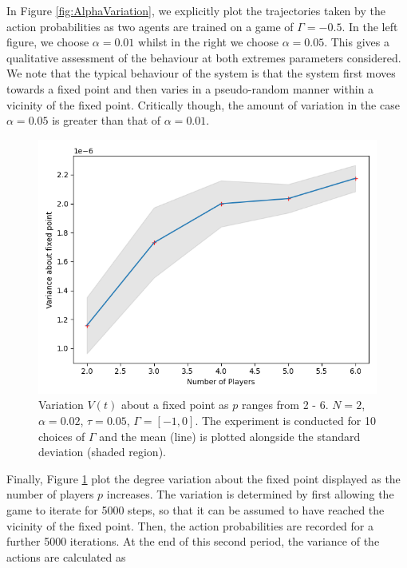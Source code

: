 \documentclass[sigconf,anonymous]{aamas}
\begin{document}
In Figure \ref{fig:AlphaVariation}, we explicitly plot the trajectories taken by the action probabilities as two agents are trained on a game of $\Gamma = -0.5$. In the left figure, we choose $\alpha = 0.01$ whilst in the right we choose $\alpha = 0.05$. This gives a qualitative assessment of the behaviour at both extremes parameters considered. We note that the typical behaviour of the system is that the system first moves towards a fixed point and then varies in a pseudo-random manner within a vicinity of the fixed point. Critically though, the amount of variation in the case $\alpha = 0.05$ is greater than that of $\alpha = 0.01$. 

\begin{figure}[t]
    \includegraphics[width = \linewidth, center]{Figures/pVarianceExpt.png}
    \caption{Variation $V(t)$ about a fixed point as $p$ ranges from 2 - 6. $N = 2$, $\alpha = 0.02$, $\tau = 0.05$, $\Gamma = [-1, 0]$. The experiment is conducted for 10 choices of $\Gamma$ and the mean (line) is plotted alongside the standard deviation (shaded region).}
    \label{fig:pVarianceExpt}
\end{figure}

Finally, Figure \ref{fig:pVarianceExpt} plot the degree variation about the fixed point displayed as the number of players $p$ increases. The variation is determined by first allowing the game to iterate for 5000 steps, so that it can be assumed to have reached the vicinity of the fixed point. Then, the action probabilities are recorded for a further 5000 iterations. At the end of this second period, the variance of the actions are calculated as
\end{document}
